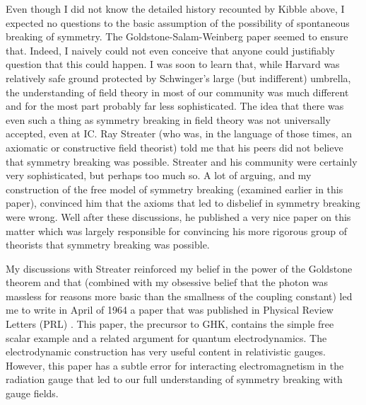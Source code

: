 \documentclass[12pt]{article}
\begin{document}
Even though I did not know the detailed history recounted by Kibble
above, I expected no questions to the basic assumption of the
possibility of spontaneous breaking of symmetry. The
Goldstone-Salam-Weinberg paper \cite{gsw;1962} seemed to ensure
that. Indeed, I naively could not even conceive that anyone could
justifiably question that this could happen.  I was soon to learn
that, while Harvard was relatively safe ground protected by
Schwinger's large (but indifferent) umbrella, the understanding of
field theory in most of our community was much different and for the
most part probably far less sophisticated. The idea that there was
even such a thing as symmetry breaking in field theory was not
universally accepted, even at IC. Ray Streater (who was, in the language of those times, an
axiomatic or constructive field theorist) told me that his peers did
not believe that symmetry breaking was possible. Streater and his
community were certainly very sophisticated, but perhaps too much
so. A lot of arguing, and my construction of the free model of
symmetry breaking (examined earlier in this paper), convinced him that
the axioms that led to disbelief in symmetry breaking were wrong. Well
after these discussions, he published a very nice paper on this matter
\cite{rs;1965} which was largely responsible for convincing his more 
rigorous group of theorists that symmetry breaking was possible.

My discussions with Streater reinforced my belief in the power of the
Goldstone theorem and that (combined with my obsessive belief that the photon
was massless for reasons more basic than the smallness of the coupling
constant) led me to write in April of 1964 a paper that was published in
Physical Review Letters (PRL) \cite{ggfu;1964}.  This paper, the precursor to
GHK, contains the simple free scalar example and a related argument for
quantum electrodynamics. The electrodynamic construction has very useful
content in relativistic gauges. However, this paper has a subtle error for interacting
electromagnetism in the radiation gauge that led to our full understanding of
symmetry breaking with gauge fields.
\end{document}
